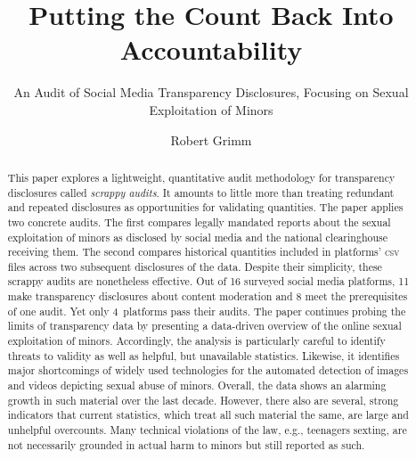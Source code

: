 \documentclass[nonacm,screen]{acmart}
\newcommand\V[1]{\textsc{\MakeLowercase{#1}}}
\begin{document}
\title{Putting the Count Back Into Accountability}
\subtitle{An Audit of Social Media Transparency Disclosures,
    Focusing on Sexual Exploitation of Minors}

\author{Robert Grimm}


\begin{abstract}
This paper explores a lightweight, quantitative audit methodology for
transparency disclosures called \emph{scrappy audits}. It amounts to little more
than treating redundant and repeated disclosures as opportunities for validating
quantities. The paper applies two concrete audits. The first compares legally
mandated reports about the sexual exploitation of minors as disclosed by social
media and the national clearinghouse receiving them. The second compares
historical quantities included in platforms' \V{CSV} files across two subsequent
disclosures of the data. Despite their simplicity, these scrappy audits are
nonetheless effective. Out of 16 surveyed social media platforms, 11 make
transparency disclosures about content moderation and 8 meet the prerequisites
of one audit. Yet only 4~platforms pass their audits. The paper continues
probing the limits of transparency data by presenting a data-driven overview of
the online sexual exploitation of minors. Accordingly, the analysis is
particularly careful to identify threats to validity as well as helpful, but
unavailable statistics. Likewise, it identifies major shortcomings of widely
used technologies for the automated detection of images and videos depicting
sexual abuse of minors. Overall, the data shows an alarming growth in such
material over the last decade. However, there also are several, strong
indicators that current statistics, which treat all such material the same, are
large and unhelpful overcounts. Many technical violations of the law, e.g.,
teenagers sexting, are not necessarily grounded in actual harm to minors but
still reported as such.
\end{abstract}

\maketitle
\end{document}
